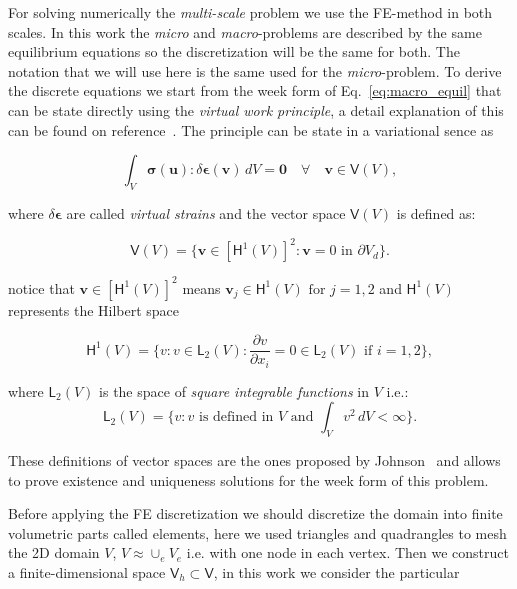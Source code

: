 \documentclass[preprint]{elsarticle}
\begin{document}
For solving numerically the \emph{multi-scale} problem we use the
FE-method in both scales.
In this work the \emph{micro} and \emph{macro}-problems 
are described by the same equilibrium equations so the discretization will
be the same for both. The notation that we will use here is the same used for
the \emph{micro}-problem.
To derive the discrete equations we start from the week form
of Eq.~\ref{eq:macro_equil} that can be state directly using the \emph{virtual work
principle}, a detail explanation of this can be found on reference~\cite{bathe-virt-work}.
The principle can be state in a variational sence as

\begin{equation}
\int_V \bm{\sigma}(\bm{u}) : \delta \bm{\epsilon}(\bm{v})
\, dV = \bm{0} \quad \forall \quad \bm{v} \in \bm{\mathsf{V}}(V),
\end{equation}

\noindent
where $\delta \bm{\epsilon}$ are called \emph{virtual strains} and the vector
space $\bm{\mathsf{V}}(V)$ is defined as:

\begin{equation}
\bm{\mathsf{V}}(V) =
\{ 
  \bm{v} \in \left[\bm{\mathsf{H}}^1(V)\right]^2: \bm{v}=0 \text{ in } \partial V_d
\}.
\end{equation}

\noindent
notice that $\bm{v} \in \left[\bm{\mathsf{H}}^1(V)\right]^2$ means 
$\bm{v}_j \in \bm{\mathsf{H}}^1(V) \text{ for } j=1,2$ and $\bm{\mathsf{H}}^1(V) $ 
represents the Hilbert space

\begin{equation}
\bm{\mathsf{H}}^1(V) = \{ 
  v : v \in \bm{\mathsf{L}}_2(V): \frac{\partial v}{\partial x_i}=0 \in \bm{\mathsf{L}}_2(V)
  \text{ if } i=1,2 
\},
\end{equation}

\noindent
where $\bm{\mathsf{L}}_2(V)$ is the space of \emph{square integrable functions} in $V$
i.e.:
\begin{equation}
\bm{\mathsf{L}}_2(V) = \{ 
  v : v \text{ is defined in } V \text{ and } \int_V v^2 \, dV < \infty
\}.
\end{equation}

These definitions of vector spaces are the ones proposed by
Johnson~\cite{johnson-first} and allows to prove existence and uniqueness
solutions for the week form of this problem.

Before applying the FE discretization we should discretize the domain into finite
volumetric parts called elements, here we used triangles and quadrangles to mesh
the 2D domain $V$, $V \approx \cup_e V_e$ i.e. with one node in each vertex.
Then we construct a finite-dimensional space 
$\bm{\mathsf{V}}_h \subset \bm{\mathsf{V}}$, in this work we consider the
particular
\end{document}
